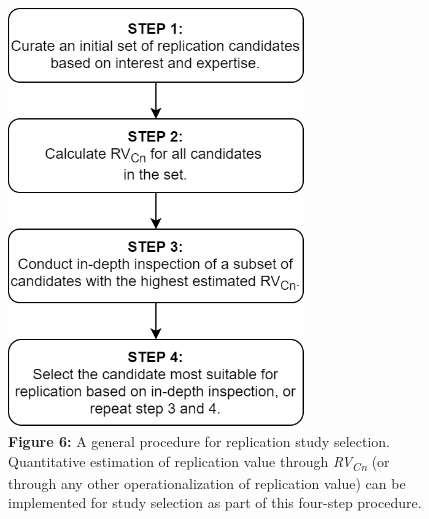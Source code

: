 \documentclass[
  english,
  man,floatsintext]{apa6}
\begin{document}
\begin{figure}
\centering
\includegraphics[width=0.7\textwidth,height=\textheight]{Figure_6.png}
\caption{\textbf{Figure 6:} A general procedure for replication study selection. Quantitative estimation of replication value through \emph{RV\textsubscript{Cn}} (or through any other operationalization of replication value) can be implemented for study selection as part of this four-step procedure. \label{fig:6}}
\end{figure}
\end{document}
